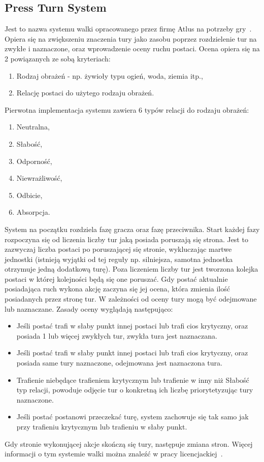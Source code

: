 \documentclass{SGGW-thesis}
\begin{document}
\subsection{Press Turn System}
Jest to nazwa systemu walki opracowanego przez firmę Atlus na potrzeby gry~\cite{SMT3}. Opiera się na zwiększeniu znaczenia tury jako zasobu poprzez rozdzielenie tur na zwykłe i naznaczone, oraz wprowadzenie oceny ruchu postaci.
Ocena opiera się na 2 powiązanych ze sobą kryteriach:
\begin{enumerate}
  \item{Rodzaj obrażeń - np. żywioły typu ogień, woda, ziemia itp.},
  \item{Relację postaci do użytego rodzaju obrażeń}.
\end{enumerate}
Pierwotna implementacja systemu zawiera 6 typów relacji do rodzaju obrażeń:
\begin{enumerate}
  \item{Neutralna},
  \item{Słabość},
  \item{Odporność},
  \item{Niewrażliwość},
  \item{Odbicie},
  \item{Absorpcja}.
\end{enumerate}
\pagebreak
System na początku rozdziela fazę gracza oraz fazę przeciwnika. Start każdej fazy rozpoczyna się od liczenia liczby tur jaką posiada poruszają się strona. Jest to zazwyczaj liczba postaci po poruszającej się stronie, wykluczając martwe jednostki (istnieją wyjątki od tej reguły np. silniejsza, samotna jednostka otrzymuje jedną dodatkową turę).
Poza liczeniem liczby tur jest tworzona kolejka postaci w której kolejności będą się one poruszać. Gdy postać aktualnie posiadająca ruch wykona akcję zaczyna się jej ocena, która zmienia ilość posiadanych przez stronę tur.
W zależności od oceny tury mogą być odejmowane lub naznaczane. Zasady oceny wyglądają następująco:
\begin{itemize}
  \item{Jeśli postać trafi w słaby punkt innej postaci lub trafi cios krytyczny, oraz posiada 1 lub więcej zwykłych tur, zwykła tura jest naznaczana.}
  \item{Jeśli postać trafi w słaby punkt innej postaci lub trafi cios krytyczny, oraz posiada same tury naznaczone, odejmowana jest naznaczona tura.}
  \item{Trafienie niebędące trafieniem krytycznym lub trafienie w inny niż Słabość typ relacji, powoduje odjęcie tur o konkretną ich liczbę priorytetyzując tury naznaczone.}
  \item{Jeśli postać postanowi przeczekać turę, system zachowuje się tak samo jak przy trafieniu krytycznym lub trafieniu w słaby punkt.}
\end{itemize}
Gdy stronie wykonującej akcje skończą się tury, następuje zmiana stron. Więcej informacji o tym systemie walki można znaleźć w pracy licencjackiej~\cite{PTS}.
\end{document}
